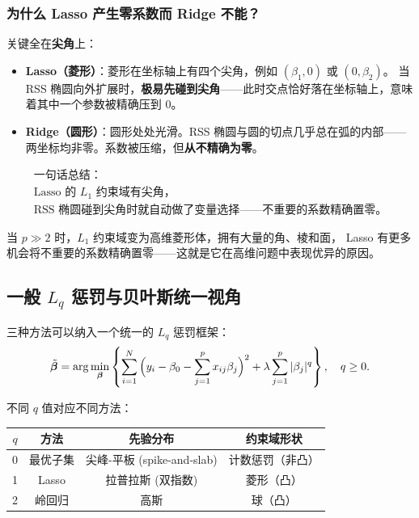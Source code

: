 \subsubsection{为什么 Lasso 产生零系数而 Ridge 不能？}

关键全在\textbf{尖角}上：

\begin{itemize}
    \item \textbf{Lasso（菱形）}：菱形在坐标轴上有四个尖角，例如 $(\beta_1, 0)$ 或 $(0, \beta_2)$。
    当 RSS 椭圆向外扩展时，\textbf{极易先碰到尖角}——此时交点恰好落在坐标轴上，意味着其中一个参数被精确压到 0。

    \item \textbf{Ridge（圆形）}：圆形处处光滑。RSS 椭圆与圆的切点几乎总在弧的内部——两坐标均非零。系数被压缩，但\textbf{从不精确为零}。
\end{itemize}

\[
\begin{array}{c}
\text{一句话总结：} \\
\text{Lasso 的 } L_1 \text{ 约束域有尖角，} \\
\text{RSS 椭圆碰到尖角时就自动做了变量选择——不重要的系数精确置零。}
\end{array}
\]

当 $p \gg 2$ 时，$L_1$ 约束域变为高维菱形体，拥有大量的角、棱和面，
Lasso 有更多机会将不重要的系数精确置零——这就是它在高维问题中表现优异的原因。

\subsection{一般 $L_q$ 惩罚与贝叶斯统一视角}

三种方法可以纳入一个统一的 $L_q$ 惩罚框架：
\begin{equation}\label{eq:Lq}
    \tilde{\bm{\beta}} = \arg\min_{\bm{\beta}} \left\{
        \sum_{i=1}^{N} \Big(y_i - \beta_0 - \sum_{j=1}^{p} x_{ij}\beta_j\Big)^2
        + \lambda \sum_{j=1}^{p} |\beta_j|^q
    \right\}, \quad q \ge 0.
\end{equation}

不同 $q$ 值对应不同方法：

\begin{center}
\renewcommand{\arraystretch}{1.3}
\begin{tabular}{c|c|c|c}
\toprule
$q$ & \textbf{方法} & \textbf{先验分布} & \textbf{约束域形状} \\
\midrule
0   & 最优子集       & 尖峰-平板 (spike-and-slab) & 计数惩罚（非凸） \\
1   & Lasso          & 拉普拉斯 (双指数)          & 菱形（凸） \\
2   & 岭回归         & 高斯                       & 球（凸） \\
\bottomrule
\end{tabular}
\end{center}

